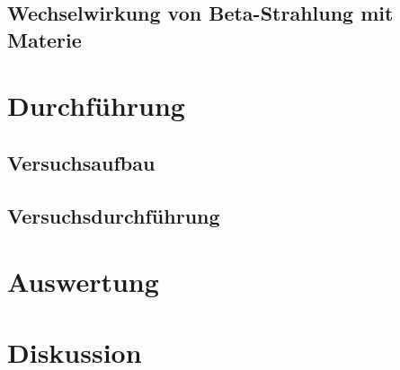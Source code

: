 \subsection{Wechselwirkung von Beta-Strahlung mit Materie}

\section{Durchführung}
\subsection{Versuchsaufbau}
\subsection{Versuchsdurchführung}
\section{Auswertung}
\section{Diskussion}
\newpage
\nocite{*}
\printbibliography
